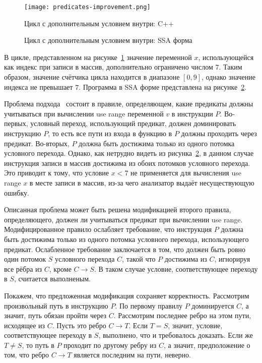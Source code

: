 \begin{figure}
    \texttt{[image: predicates-improvement.png]}
    \caption{Цикл с дополнительным условием внутри: C++}
    \label{fig:predicates-improvement-cpp}
\end{figure}

\begin{figure}
    \caption{Цикл с дополнительным условием внутри: SSA форма}
    \label{fig:predicates-improvement-ssa}
\end{figure}

В цикле, представленном на
рисунке~\ref{fig:predicates-improvement-cpp} значение переменной $x$,
использующейся как индекс при записи в массив, дополнительно
ограничено числом $7$. Таким образом, значение счётчика цикла
находится в диапазоне $[0, 9]$, однако значение индекса не превышает
$7$. Программа в SSA форме представлена на
рисунке~\ref{fig:predicates-improvement-ssa}.

Проблема подхода~\cite{li2010practical} состоит в правиле,
определяющем, какие предикаты должны учитываться при вычислении use
range переменной $v$ в инструкции $P$. Во-первых, условный переход,
использующий предикат, должен доминировать инструкцию $P$, то есть все
пути из входа в функцию в $P$ должны проходить через
предикат. Во-вторых, $P$ должна быть достижима только из одного
потомка условного перехода. Однако, как нетрудно видеть из
рисунка~\ref{fig:predicates-improvement-ssa}, в данном случае
инструкция записи в массив достижима из обоих потомков условного
перехода. Это приводит к тому, что условие $x < 7$ не применяется для
вычисления use range $x$ в месте записи в массив, из-за чего
анализатор выдаёт несуществующую ошибку.

Описанная проблема может быть решена модификацией второго правила,
определяющего, должен ли учитываться предикат при вычислении use
range. Модифицированное правило ослабляет требование, что инструкция
$P$ должна быть достижима только из одного потомка условного перехода,
использующего предикат. Ослабленное требование заключается в том, что
должен быть ровно один потомок $S$ условного перехода $C$, такой что
$P$ достижима из $C$, игнорируя все рёбра из $C$, кроме
$C \rightarrow S$. В таком случае условие, соответствующее переходу в
$S$, считается выполненым.

Покажем, что предложенная модификация сохраняет
корректность. Рассмотрим произвольный путь в инструкцию $P$. По
первому правилу $P$ доминируется $C$, а значит, путь обязан пройти
через $C$. Рассмотрим последнее ребро на этом пути, исходящее из
$C$. Пусть это ребро $C \rightarrow T$. Если $T = S$, значит, условие,
соответствующее переходу в $S$, выполнено, что и требовалось
доказать. Если же $T \neq S$, то путь в $P$ проходит по другому ребру
из $C$, а значит, предположение о том, что ребро $C \rightarrow T$
является последним на пути, неверно.

